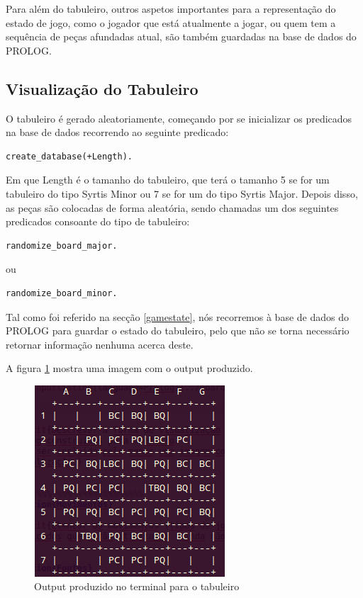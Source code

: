 \documentclass[a4paper]{article}
\begin{document}
Para além do tabuleiro, outros aspetos importantes para a representação do estado de jogo, como o jogador que está atualmente a jogar, ou quem tem a sequência de peças afundadas atual, são também guardadas na base de dados do PROLOG.

\subsection{Visualização do Tabuleiro}

O tabuleiro é gerado aleatoriamente, começando por se inicializar os predicados na base de dados recorrendo ao seguinte predicado:

\begin{lstlisting}
create_database(+Length).
\end{lstlisting}

Em que Length é o tamanho do tabuleiro, que terá o tamanho 5 se for um tabuleiro do tipo Syrtis Minor ou 7 se for um do tipo Syrtis Major. Depois disso, as peças são colocadas de forma aleatória, sendo chamadas um dos seguintes predicados consoante do tipo de tabuleiro:

\begin{lstlisting}
randomize_board_major.
\end{lstlisting}

ou 

\begin{lstlisting}
randomize_board_minor.
\end{lstlisting}

Tal como foi referido na secção \ref{gamestate}, nós recorremos à base de dados do PROLOG para guardar o estado do tabuleiro, pelo que não se torna necessário retornar informação nenhuma acerca deste.

A figura \ref{fig:outputboard} mostra uma imagem com o output produzido.

\begin{figure}[h]
\centering
\includegraphics[scale=0.5]{outputboard.png}
\caption{Output produzido no terminal para o tabuleiro}
\label{fig:outputboard}
\end{figure}
\end{document}
